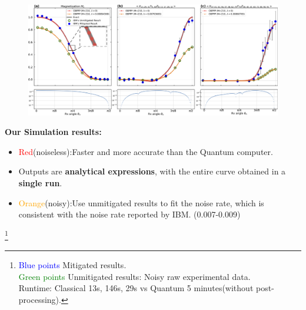 \documentclass[10pt]{beamer}
\begin{document}
\begin{CJK}{UTF8}{gbsn}
 \begin{frame}[fragile]%
  \vspace{-1.5em}
  \begin{figure}
    \centering
    \includegraphics[width=1.05\textwidth]{fig/simibm1_zoom.png}
  \end{figure}
  \vspace{-1.5em}
  \textbf{Our Simulation results:}
  \vspace{-1em}
  \begin{itemize}
    \item \textcolor{red}{Red}(noiseless):Faster and more accurate than the Quantum computer.
    \item Outputs are \textbf{analytical expressions}, with the entire curve obtained in a \textbf{single run}.
    \item \textcolor{orange}{Orange}(noisy):Use unmitigated results to fit the noise rate, which is consistent with the noise rate reported by IBM. \small{(0.007-0.009)}
  \end{itemize}
  \vspace{-1em}
  \footnote{
    \textcolor{blue}{Blue points} Mitigated results.\\
  \textcolor{green}{Green points} Unmitigated results: Noisy raw experimental data.\\
  Runtime: Classical 13s, 146s, 29s vs Quantum 5 minutes(without post-processing).}
\end{frame}
\end{CJK}
\end{document}
